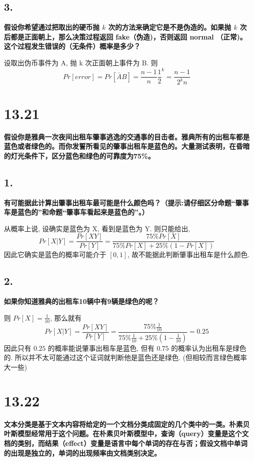 \documentclass[UTF8]{article}
\newcommand{\jumpLine} {\hspace*{\fill} \par}
\begin{document}
\subsection*{3.}
\noindent \textbf{假设你希望通过把取出的硬币抛 $k$ 次的方法来确定它是不是伪造的。如果抛 $k$ 次后都是正面朝上，那么决策过程返回 fake（伪造)，否则返回 normal （正常)。这个过程发生错误的（无条件）概率是多少？} \\\jumpLine \noindent
设取出伪币事件为 A, 抛 k 次正面朝上事件为 B. 则
$$Pr[error]=Pr[\bar{A}B]=\frac{n-1}{n}\frac{1}{2}^k=\frac{n-1}{2^k n}$$

\section*{13.21}
\noindent \textbf{假设你是雅典一次夜间出租车肇事逃逸的交通事的目击者。雅典所有的出租车都是蓝色或者绿色的。而你发誓所看见的肇事出租车是蓝色的。大量测试表明，在昏暗的灯光条件下，区分蓝色和绿色的可靠度为75\%。}
\subsection*{1.}
\noindent \textbf{有可能据此计算出肇事出租车最可能是什么颜色吗？（提示:请仔细区分命题“肇事车是蓝色的”和命题“肇事车看起来是蓝色的”。）} \\\jumpLine \noindent
从概率上说, 设确实是蓝色为 X, 看到是蓝色为 Y. 则只能给出,
$$Pr[X|Y] = \frac{Pr[XY]}{Pr[Y]} = \frac{75\% Pr[X]}{75\%Pr[X]+25\%(1-Pr[X])}$$
因此它确实是蓝色的概率可能介于 $[0,1]$, 故不能据此判断肇事出租车是什么颜色.
\subsection*{2.}
\noindent \textbf{如果你知道雅典的出租车10辆中有9辆是绿色的呢？} \\\jumpLine\noindent
则 $Pr[X]=\frac{1}{10}$, 那么就有
$$Pr[X|Y] = \frac{Pr[XY]}{Pr[Y]} = \frac{75\% \frac{1}{10}}{75\%\frac{1}{10}+25\%(1-\frac{1}{10})}=0.25$$
因此只有 $0.25$ 的概率能说肇事出租车是蓝色, 但有 $0.75$ 的概率认为出租车是绿色的. 所以并不太可能通过这个证词就判断他是蓝色还是绿色. (但相较而言绿色概率大一些)

\section*{13.22}
\noindent \textbf{文本分类是基于文本内容将给定的一个文档分类成固定的几个类中的一类。朴素贝叶斯模型经常用于这个问题。在朴素贝叶斯模型中，查询（query）变量是这个文档的类别，而结果（effect）变量是语言中每个单词的存在与否；假设文档中单词的出现是独立的，单词的出现频率由文档类别决定。}
\end{document}
